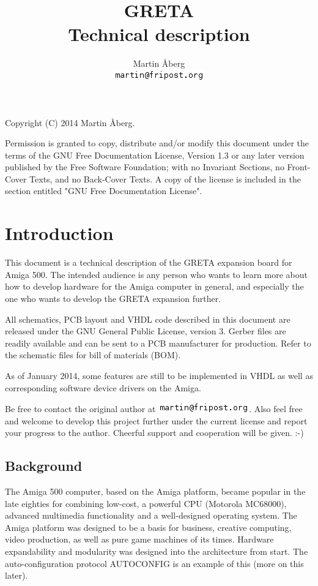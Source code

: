 \documentclass[a4paper]{report}
\title{GRETA\\Technical description}
\author{Martin Åberg \\ \includegraphics[scale=0.8]{email.png}}
\begin{document}
\maketitle
Copyright (C) 2014 Martin Åberg.\newline

Permission is granted to copy, distribute and/or modify this
document under the terms of the GNU Free Documentation License,
Version 1.3 or any later version published by the Free Software
Foundation; with no Invariant Sections, no Front-Cover Texts,
and no Back-Cover Texts.  A copy of the license is included
in the section entitled "GNU Free Documentation License".
\tableofcontents

\chapter{Introduction}
This document is a technical description of the GRETA expansion
board for Amiga 500. The intended audience is any person who
wants to learn more about how to develop hardware for the Amiga
computer in general, and especially the one who wants to develop
the GRETA expansion further.

All schematics, PCB layout and VHDL code described in this
document are released under the GNU General Public License,
version 3. Gerber files are readily available and can be sent
to a PCB manufacturer for production. Refer to the schematic
files for bill of materials (BOM).

As of January 2014, some features are still to be implemented
in VHDL as well as corresponding software device drivers on
the Amiga.

Be free to contact the original author at
\includegraphics[scale=0.8]{email.png}. Also feel free and
welcome to develop this project further under the current
license and report your progress to the author. Cheerful
support and cooperation will be given. :-)

\section{Background}
The Amiga 500 computer, based on the Amiga platform, became
popular in the late eighties for combining low-cost, a powerful
CPU (Motorola MC68000), advanced multimedia functionality
and a well-designed operating system. The Amiga platform
was designed to be a basis for business, creative computing,
video production, as well as pure game machines of its times.
Hardware expandability and modularity was designed into the
architecture from start. The auto-configuration protocol
AUTOCONFIG is an example of this (more on this later).
\end{document}
